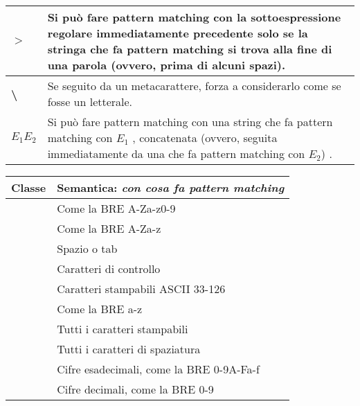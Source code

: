 \begin{center}
\begin{tabular}{|p{3cm}|p{10cm}|}
		\textbf{$>$}			& Si può fare pattern matching con la sottoespressione regolare immediatamente precedente solo se la stringa che fa pattern matching si trova alla fine di una parola (ovvero, prima di alcuni spazi). \\ \hline
		\textbf{\textbackslash}	& Se seguito da un metacarattere, forza a considerarlo come se fosse un letterale. \\ \hline
		\textbf{$E_{1}E_{2}$}		& Si può fare pattern matching con una string che fa 
		pattern matching con $ E_{1} $ , concatenata (ovvero, seguita immediatamente da una che fa pattern matching con $ E_{2} $) .\\ \hline
	\end{tabular}
\end{center}
\newpage
\begin{center}
	 \label{tab:table-posix} 
	\begin{tabular}{|l|l|}
	\hline
		\textbf{Classe} & \textbf{Semantica: \textit{con cosa fa pattern matching}} \\ \hline
		[:alnum:]	& Come la BRE A-Za-z0-9 \\ \hline
		[:alpha:]	& Come la BRE A-Za-z \\ \hline
		[:blank:]	& Spazio o tab \\ \hline
		[:cntrl:]	& Caratteri di controllo \\ \hline
		[:graph:]	& Caratteri stampabili ASCII 33-126 \\ \hline
		[:lower:]	& Come la BRE a-z \\ \hline
		[:print:]	& Tutti i caratteri stampabili \\ \hline
		[:space:]	& Tutti i caratteri di spaziatura \\ \hline
		[:xdigit:]	& Cifre esadecimali, come la BRE 0-9A-Fa-f \\ \hline
		[:digit:]	& Cifre decimali, come la BRE 0-9 \\ \hline
	\end{tabular}
\end{center}

